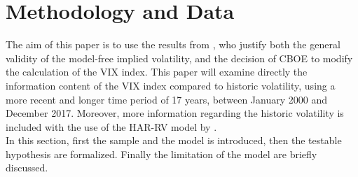 
\section{Methodology and Data}\label{sec:4MethodData}
The aim of this paper is to use the results from \textcite{jiang2003}, who justify both the general validity of the model-free implied volatility, and the decision of \ac{CBOE} to modify the calculation of the \ac{VIX} index. This paper will examine directly the information content of the \ac{VIX} index compared to historic volatility, using a more recent and longer time period of 17 years, between January 2000 and December 2017. Moreover, more information regarding the historic volatility is included with the use of the HAR-RV model by \textcite{corsi2009}.\\
In this section, first the sample and the model is introduced, then the testable hypothesis are formalized. Finally the limitation of the model are briefly discussed.

